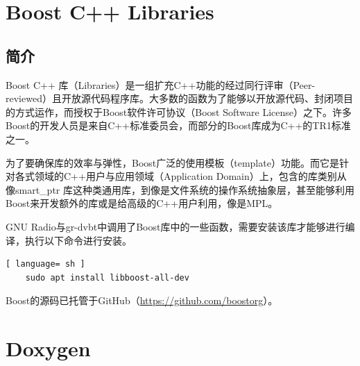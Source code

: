 	\section{Boost C++ Libraries}
		\subsection{简介}
			\par Boost C++ 库（Libraries）是一组扩充C++功能的经过同行评审（Peer-reviewed）且开放源代码程序库。大多数的函数为了能够以开放源代码、封闭项目的方式运作，而授权于Boost软件许可协议（Boost Software License）之下。许多Boost的开发人员是来自C++标准委员会，而部分的Boost库成为C++的TR1标准之一。
			\par 为了要确保库的效率与弹性，Boost广泛的使用模板（template）功能。而它是针对各式领域的C++用户与应用领域（Application Domain）上，包含的库类别从像smart\_ptr 库这种类通用库，到像是文件系统的操作系统抽象层，甚至能够利用Boost来开发额外的库或是给高级的C++用户利用，像是MPL。\cite{ wiki:Boost}
			\par GNU Radio与gr-dvbt中调用了Boost库中的一些函数，需要安装该库才能够进行编译，执行以下命令进行安装。
			\begin{lstlisting}[ language= sh ]
	sudo apt install libboost-all-dev
			\end{lstlisting}
			\par Boost的源码已托管于GitHub（\href{https://github.com/boostorg}{https://github.com/boostorg}）。
	\section{Doxygen}
